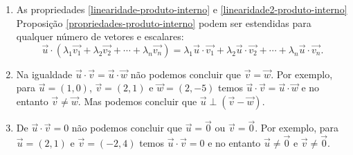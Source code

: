 \begin{observacao}
  \begin{enumerate}
    \item As propriedades \ref{linearidade-produto-interno} e \ref{linearidade2-produto-interno} Proposi\c{c}\~ao \ref{propriedades-produto-interno} podem ser estendidas para qualquer n\'umero de vetores e escalares:
    \[
      \vec{u}\cdot(\lambda_1\vec{v_1} + \lambda_2\vec{v_2} + \cdots + \lambda_n\vec{v_n} ) = \lambda_1\vec{u}\cdot\vec{v_1} + \lambda_2\vec{u}\cdot\vec{v_2} + \cdots + \lambda_n\vec{u}\cdot\vec{v_n}.
    \]
    \item Na igualdade $\vec{u}\cdot\vec{v} = \vec{u}\cdot\vec{w}$ n\~ao podemos concluir que $\vec{v} = \vec{w}$. Por exemplo, para $\vec{u} = (1, 0)$, $\vec{v} = (2, 1)$ e $\vec{w} = (2, -5)$ temos $\vec{u}\cdot\vec{v} = \vec{u}\cdot\vec{w}$ e no entanto $\vec{v} \ne \vec{w}$. Mas podemos concluir que $\vec{u}\perp(\vec{v} - \vec{w})$.
    \item De $\vec{u}\cdot\vec{v} = 0$ n\~ao podemos concluir que $\vec{u} = \vec{0}$ ou $\vec{v} = \vec{0}$. Por exemplo, para $\vec{u} = (2, 1)$ e $\vec{v} = (-2, 4)$ temos $\vec{u}\cdot\vec{v} = 0$ e no entanto $\vec{u} \ne \vec{0}$ e $\vec{v} \ne \vec{0}$.
  \end{enumerate}
\end{observacao}

